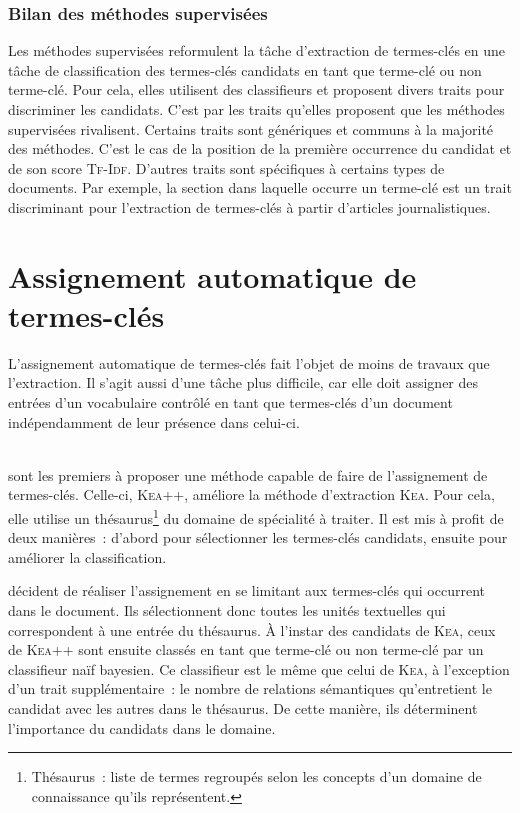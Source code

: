       \subsubsection{Bilan des méthodes supervisées}
      \label{subsubsec:main-state_of_the_art-automatic_keyphrase_extraction-supervised_keyphrase_extraction-conclusion}
        Les méthodes supervisées reformulent la tâche d'extraction de
        termes-clés en une tâche de classification des termes-clés candidats en
        tant que \og{}terme-clé\fg{} ou \og{}non terme-clé\fg{}. Pour cela,
        elles utilisent des classifieurs et proposent divers traits pour
        discriminer les candidats. C'est par les traits qu'elles proposent que
        les méthodes supervisées rivalisent. Certains traits sont génériques et
        communs à la majorité des méthodes. C'est le cas de la position de la
        première occurrence du candidat et de son score \textsc{Tf-Idf}.
        D'autres traits sont spécifiques à certains types de documents. Par
        exemple, la section dans laquelle occurre un terme-clé est un trait
        discriminant pour l'extraction de termes-clés à partir d'articles
        journalistiques.

  \section{Assignement automatique de termes-clés}
  \label{sec:main-state_of_the_art-automatic_keyphrase_assignment}
    L'assignement automatique de termes-clés fait l'objet de moins de travaux
    que l'extraction. Il s'agit aussi d'une tâche plus difficile, car elle doit
    assigner des entrées d'un vocabulaire contrôlé en tant que termes-clés d'un
    document indépendamment de leur présence dans celui-ci.

    ~\\ sont les premiers à proposer une
    méthode capable de faire de l'assignement de termes-clés. Celle-ci,
    \textsc{Kea}++, améliore la méthode d'extraction \textsc{Kea}. Pour cela,
    elle utilise un thésaurus\footnote{Thésaurus~: liste de termes regroupés
    selon les concepts d'un domaine de connaissance qu'ils représentent.} du
    domaine de spécialité à traiter. Il est mis à profit de deux manières~:
    d'abord pour sélectionner les termes-clés candidats, ensuite pour améliorer
    la classification.

     décident de réaliser l'assignement en se
    limitant aux termes-clés qui occurrent dans le document. Ils sélectionnent
    donc toutes les unités textuelles qui correspondent à une entrée du
    thésaurus. À l'instar des candidats de \textsc{Kea}, ceux de \textsc{Kea++}
    sont ensuite classés en tant que \og{}terme-clé\fg{} ou \og{}non
    terme-clé\fg{} par un classifieur naïf bayesien. Ce classifieur est le même
    que celui de \textsc{Kea}, à l'exception d'un trait supplémentaire~: le
    nombre de relations sémantiques qu'entretient le candidat avec les autres
    dans le thésaurus. De cette manière, ils déterminent l'importance du
    candidats dans le domaine.

